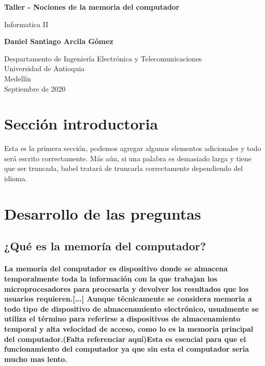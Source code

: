 \documentclass{article}
\begin{document}
\begin{titlepage}
    \begin{center}
        \vspace*{1cm}
            
        \Huge
        \textbf{Taller - Nociones de la memoria del computador}
            
        \vspace{0.5cm}
        \LARGE
        Informatica II
            
        \vspace{1.5cm}
            
        \textbf{Daniel Santiago Arcila Gómez}
            
        \vfill
            
        \vspace{0.8cm}
            
        \Large
        Despartamento de Ingeniería Electrónica y Telecomunicaciones\\
        Universidad de Antioquia\\
        Medellín\\
        Septiembre de 2020
            
    \end{center}
\end{titlepage}

\tableofcontents

\section{Sección introductoria}
Esta es la primera sección, podemos agregar algunos elementos adicionales y todo será escrito correctamente. Más aún, si una palabra es demasiado larga y tiene que ser truncada, babel tratará de truncarla correctamente dependiendo del idioma.

\section{Desarrollo de las preguntas} \label{contenido}

\subsection{¿Qué es la memoría del computador?}

\paragraph{La memoria del computador es dispositivo donde se almacena temporalmente toda la información con la que trabajan los microprocesadores para procesarla y devolver los resultados que los usuarios requieren.[...] Aunque técnicamente se considera memoria a todo tipo de dispositivo de almacenamiento
electrónico, usualmente se utiliza el término para referirse a dispositivos de almacenamiento
temporal y alta velocidad de acceso, como lo es la memoria principal del computador.(Falta referenciar aquí)\cite{taller}Esta es esencial para que el funcionamiento del computador ya que sin esta el computador seria mucho mas lento.}
\end{document}
